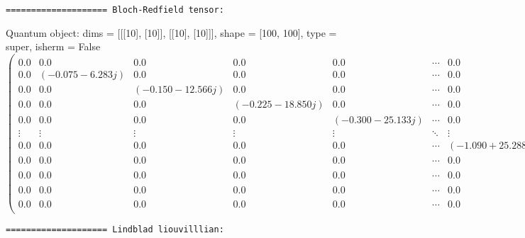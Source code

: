\documentclass{article}
\begin{document}
    \begin{Verbatim}[commandchars=\\\{\}]
==================== Bloch-Redfield tensor:
    \end{Verbatim}

    Quantum object: dims = [[[10], [10]], [[10], [10]]], shape = [100, 100], type = super, isherm = False\begin{equation*}\begin{pmatrix}0.0 & 0.0 & 0.0 & 0.0 & 0.0 & \cdots & 0.0 & 0.0 & 0.0 & 0.0 & 1.926\times10^{-25}\\0.0 & (-0.075-6.283j) & 0.0 & 0.0 & 0.0 & \cdots & 0.0 & 0.0 & 0.0 & 0.0 & 0.0\\0.0 & 0.0 & (-0.150-12.566j) & 0.0 & 0.0 & \cdots & 0.0 & 0.0 & 0.0 & 0.0 & 0.0\\0.0 & 0.0 & 0.0 & (-0.225-18.850j) & 0.0 & \cdots & 0.0 & 0.0 & 0.0 & 0.0 & 0.0\\0.0 & 0.0 & 0.0 & 0.0 & (-0.300-25.133j) & \cdots & 0.0 & 0.0 & 0.0 & 0.0 & 0.0\\\vdots & \vdots & \vdots & \vdots & \vdots & \ddots & \vdots & \vdots & \vdots & \vdots & \vdots\\0.0 & 0.0 & 0.0 & 0.0 & 0.0 & \cdots & (-1.090+25.288j) & 0.0 & 0.0 & 0.0 & 0.0\\0.0 & 0.0 & 0.0 & 0.0 & 0.0 & \cdots & 0.0 & (-1.165+19.005j) & 0.0 & 0.0 & 0.0\\0.0 & 0.0 & 0.0 & 0.0 & 0.0 & \cdots & 0.0 & 0.0 & (-1.240+12.722j) & 0.0 & 0.0\\0.0 & 0.0 & 0.0 & 0.0 & 0.0 & \cdots & 0.0 & 0.0 & 0.0 & (-1.312+6.437j) & 0.0\\0.0 & 0.0 & 0.0 & 0.0 & 0.0 & \cdots & 0.0 & 0.0 & 0.0 & 0.0 & -1.286\\\end{pmatrix}\end{equation*}

    
    \begin{Verbatim}[commandchars=\\\{\}]
==================== Lindblad liouvilllian:
    \end{Verbatim}
\end{document}

